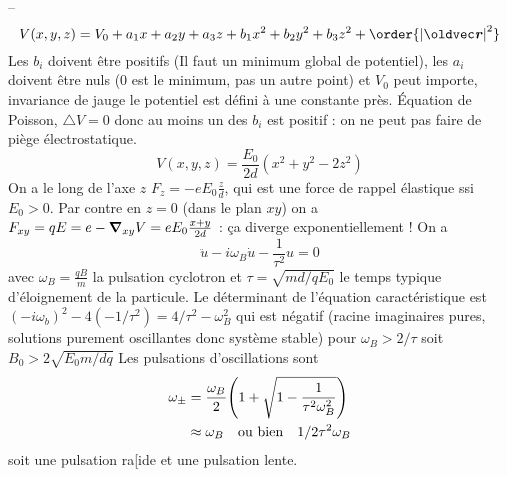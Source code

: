 \begin{solution}
\begin{questions}
    \questioncours --
    $$
    V(x, y, z) = V_0 + a_1 x + a_2 y + a_3 z + b_1 x^2+ b_2y^2 + b_3z^2 + \order{\abs{\vr}^2}
    $$
    \question Les $b_i$ doivent être positifs (Il faut un minimum global de potentiel), les $a_i$ doivent être nuls (0 est le minimum, pas un autre point) et $V_0$ peut importe, invariance de jauge le potentiel est défini à une constante près.
    \question Équation de Poisson, $\triangle V = 0$ donc au moins un des $b_i$ est positif : on ne peut pas faire de piège électrostatique.
    $$
    V(x, y, z) = \frac{E_0}{2d}(x^2+y^2-2z^2)
    $$
    \question On a le long de l'axe $z$ $F_z = -eE_0 \frac{z}{d}$, qui est une force de rappel élastique ssi  $E_0 > 0$. Par contre en $z=0$ (dans le plan $xy$) on a $F_{xy} = qE = e -\grad_{xy} V = eE_0 \frac{x+y}{2d}$ : ça diverge exponentiellement !
    \question On a $$ \ddot u - i \omega_B \dot u - \frac{1}{\tau^2}u = 0 $$
    avec $\omega_B = \frac{qB}{m}$ la pulsation cyclotron et $\tau = \sqrt{md/q E_0}$ le temps typique d'éloignement de la particule.
    \question Le déterminant de l'équation caractéristique est $(-i\omega_b)^2 - 4(-1/\tau^2) = 4/\tau^2 - \omega_B^2$ qui est négatif (racine imaginaires pures, solutions purement oscillantes donc système stable) pour $\omega_B > 2/\tau$ soit $B_0 > 2\sqrt{E_0 m/ dq}$
    \question Les pulsations d'oscillations sont 
    \begin{align*}
        \omega_\pm &= \frac{\omega_B}{2}\qty(1 + \sqrt{1 - \frac{1}{\tau^2\omega_B^2}}) \\
        &\approx \omega_B \qqtext{ou bien} 1/2\tau^2\omega_B
    \end{align*} 
    soit une pulsation ra[ide et une pulsation lente.
    
\end{questions}
\end{solution}
